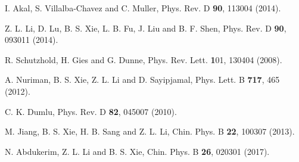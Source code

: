 \documentclass[aps,preprint,superscriptaddress]{revtex4}
\begin{document}
\begin{thebibliography}{99}
I. Akal, S. Villalba-Chavez and C. Muller,
Phys. Rev. D {\textbf{90}}, 113004 (2014).

Z. L. Li, D. Lu, B. S. Xie, L. B. Fu, J. Liu and B. F. Shen,
Phys. Rev. D {\textbf{90}}, 093011 (2014).

R. Schutzhold, H. Gies and G. Dunne,
Phys. Rev. Lett. {\textbf 101}, 130404 (2008).

A. Nuriman, B. S. Xie, Z. L. Li and D. Sayipjamal,
Phys. Lett. B {\textbf {717}}, 465 (2012).

C. K. Dumlu,
Phys. Rev. D {\textbf{82}}, 045007 (2010).

M. Jiang, B. S. Xie, H. B. Sang and Z. L. Li,
Chin. Phys. B {\textbf{22}}, 100307 (2013).

N. Abdukerim, Z. L. Li and B. S. Xie,
Chin. Phys. B {\textbf{26}}, 020301 (2017).


\end{thebibliography}
\end{document}
